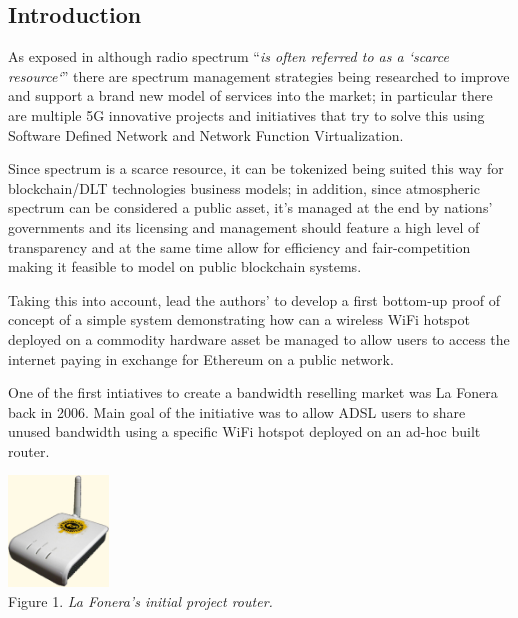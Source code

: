 \documentclass[12pt]{amsart}
\begin{document}
\setlength{\columnsep}{20pt}
\begin{multicols}{2}
\section{Introduction}\label{sec:introduction}

\vspace{0.35cm}
As exposed in \cite{spectrumnh} although radio spectrum
``\textit{is often
  referred to as a `scarce resource`}'' there are
spectrum management strategies
being researched to improve and
support a brand new model of services
into the market; in particular there are
multiple 5G\cite{5g} innovative projects and initiatives
that try to solve this using Software
Defined Network\cite{sdns}
and Network Function Virtualization\cite{nfv}.

\vspace{0.35cm}

Since spectrum is a scarce resource, it can
be tokenized being suited this
way for blockchain/DLT technologies business models;
in addition, since
atmospheric spectrum can be considered a public
asset, it's managed at the end by nations' governments
and its licensing and management should feature
a high level of transparency and at the same time
allow for efficiency and fair-competition making it
feasible to model on public blockchain systems.

\vspace{0.35cm}

Taking this into account, lead the authors' to develop
a first bottom-up proof of concept of a simple system
demonstrating how can a wireless WiFi hotspot
deployed on a commodity hardware asset\cite{RaspberryPi19}
be managed to allow users to access the internet
paying in exchange for Ethereum on a public network.

\vspace{0.35cm}

One of the first intiatives to create
a bandwidth reselling market was La Fonera\cite{fon}
back in 2006. Main goal of the initiative was
to allow ADSL users to share unused bandwidth using
a specific WiFi hotspot deployed on an ad-hoc
built router.

\begin{center}
  \includegraphics[keepaspectratio, width=0.2\textwidth]{images/lafonera-sourcewikipedia.eps}
  \\
  Figure 1. \textit{La Fonera's initial project router.}
\end{center}


\end{multicols}
\end{document}
